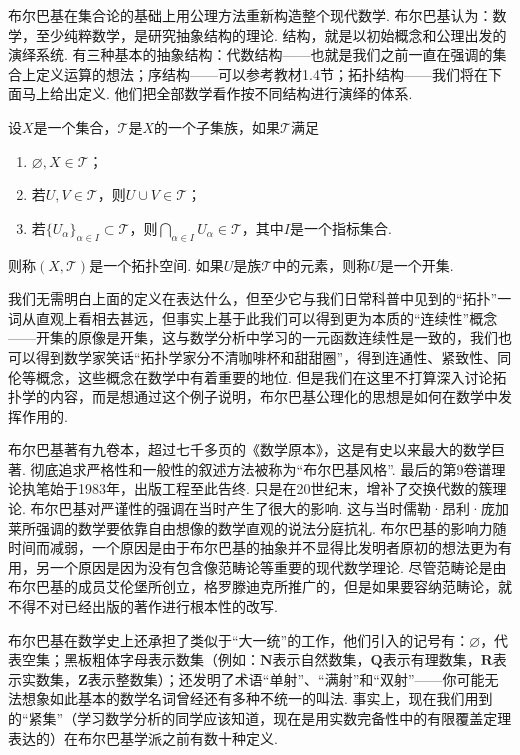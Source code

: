 布尔巴基在集合论的基础上用公理方法重新构造整个现代数学. 布尔巴基认为：数学，至少纯粹数学，是研究抽象结构的理论. 结构，就是以初始概念和公理出发的演绎系统. 有三种基本的抽象结构：代数结构——也就是我们之前一直在强调的集合上定义运算的想法；序结构——可以参考教材1.4节；拓扑结构——我们将在下面马上给出定义. 他们把全部数学看作按不同结构进行演绎的体系.

\begin{definition}
    设$X$是一个集合，$\mathscr{T}$是$X$的一个子集族，如果$\mathscr{T}$满足
    \begin{enumerate}
        \item $\varnothing,X\in \mathscr{T}$；

        \item 若$U,V\in \mathscr{T}$，则$U\cup V\in \mathscr{T}$；

        \item 若$\{U_\alpha\}_{\alpha\in I}\subset \mathscr{T}$，则$\bigcap_{\alpha\in I}U_\alpha\in \mathscr{T}$，其中$I$是一个指标集合.
    \end{enumerate}
    则称$(X,\mathscr{T})$是一个拓扑空间. 如果$U$是族$\mathscr{T}$中的元素，则称$U$是一个开集.
\end{definition}

我们无需明白上面的定义在表达什么，但至少它与我们日常科普中见到的``拓扑''一词从直观上看相去甚远，但事实上基于此我们可以得到更为本质的``连续性''概念——开集的原像是开集，这与数学分析中学习的一元函数连续性是一致的，我们也可以得到数学家笑话``拓扑学家分不清咖啡杯和甜甜圈''，得到连通性、紧致性、同伦等概念，这些概念在数学中有着重要的地位. 但是我们在这里不打算深入讨论拓扑学的内容，而是想通过这个例子说明，布尔巴基公理化的思想是如何在数学中发挥作用的.

布尔巴基著有九卷本，超过七千多页的《数学原本》，这是有史以来最大的数学巨著. 彻底追求严格性和一般性的叙述方法被称为``布尔巴基风格''. 最后的第9卷谱理论执笔始于1983年，出版工程至此告终. 只是在20世纪末，增补了交换代数的簇理论. 布尔巴基对严谨性的强调在当时产生了很大的影响. 这与当时儒勒·昂利·庞加莱所强调的数学要依靠自由想像的数学直观的说法分庭抗礼. 布尔巴基的影响力随时间而减弱，一个原因是由于布尔巴基的抽象并不显得比发明者原初的想法更为有用，另一个原因是因为没有包含像范畴论等重要的现代数学理论. 尽管范畴论是由布尔巴基的成员艾伦堡所创立，格罗滕迪克所推广的，但是如果要容纳范畴论，就不得不对已经出版的著作进行根本性的改写.

布尔巴基在数学史上还承担了类似于``大一统''的工作，他们引入的记号有：$\varnothing$，代表空集；黑板粗体字母表示数集（例如：$\mathbf{N}$表示自然数集，$\mathbf{Q}$表示有理数集，$\mathbf{R}$表示实数集，$\mathbf{Z}$表示整数集）；还发明了术语``单射''、``满射''和``双射''——你可能无法想象如此基本的数学名词曾经还有多种不统一的叫法. 事实上，现在我们用到的``紧集''（学习数学分析的同学应该知道，现在是用实数完备性中的有限覆盖定理表达的）在布尔巴基学派之前有数十种定义.

